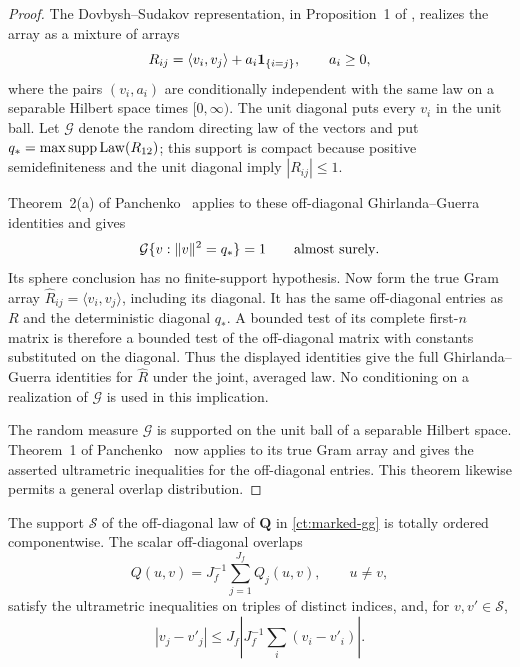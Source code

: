 \begin{proof}
The Dovbysh--Sudakov representation, in Proposition~1 of
\cite{Panchenko2010DS}, realizes the array as a mixture of arrays
\[
 R_{ij}=\langle v_i,v_j\rangle+a_i\mathbf 1_{\{i=j\}},\qquad a_i\ge0,
\]
where the pairs $(v_i,a_i)$ are conditionally independent with the
same law on a separable Hilbert space times $[0,\infty)$.  The unit
diagonal puts every $v_i$ in the unit ball.  Let $\mathcal G$ denote
the random directing law of the vectors and put
$q_* = \max\operatorname{supp}\operatorname{Law}(R_{12})$; this support is compact
because positive semidefiniteness and the unit diagonal imply
$|R_{ij}|\le1$.

Theorem~2(a) of Panchenko~\cite{Panchenko2010GG} applies to these
off-diagonal Ghirlanda--Guerra identities and gives
\[
 \mathcal G\{v:\|v\|^2=q_*\}=1\qquad\hbox{almost surely}.
\]
Its sphere conclusion has no finite-support hypothesis.  Now form the
true Gram array $\widehat R_{ij}=\langle v_i,v_j\rangle$, including its
diagonal.  It has the same off-diagonal entries as $R$ and the
deterministic diagonal $q_*$.  A bounded test of its complete first-$n$
matrix is therefore a bounded test of the off-diagonal matrix with
constants substituted on the diagonal.  Thus the displayed identities
give the full Ghirlanda--Guerra identities for $\widehat R$ under the
joint, averaged law.  No conditioning on a realization of
$\mathcal G$ is used in this implication.

The random measure $\mathcal G$ is supported on the unit ball of a
separable Hilbert space.  Theorem~1 of
Panchenko~\cite{Panchenko2013UM} now applies to its true Gram array and
gives the asserted ultrametric inequalities for the off-diagonal
entries.  This theorem likewise permits a general overlap distribution.
\end{proof}

\begin{lemma}\label{ct:ordering}
The support $\mathcal S$ of the off-diagonal law of $\mathbf Q$ in
\eqref{ct:marked-gg} is totally ordered componentwise.  The scalar off-diagonal overlaps
\[
 Q(u,v)=J_f^{-1}\sum_{j=1}^{J_f}Q_j(u,v),\qquad u\ne v,
\]
satisfy the ultrametric inequalities on triples of distinct indices, and,
for $v,v'\in\mathcal S$,
\begin{equation}\label{ct:coordinate-control}
             |v_j-v'_j|\le J_f\left|J_f^{-1}\sum_i(v_i-v'_i)\right|.
\end{equation}
\end{lemma}

